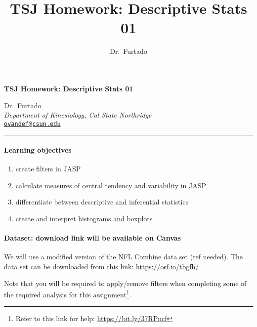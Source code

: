 \documentclass[11pt,]{article}
\title{TSJ \textbar{} Homework: Descriptive Stats 01}
\author{Dr.~Furtado}
\date{}
\newcommand{\blankline}{\quad\pagebreak[2]}
\providecommand{\tightlist}{%
  \setlength{\itemsep}{0pt}\setlength{\parskip}{0pt}}
\begin{document}
  



\thispagestyle{plain} 

\begin{flushleft}\Large \bf TSJ \textbar{} Homework: Descriptive Stats
01  \end{flushleft}
	\vspace{1 mm}   
Dr.~Furtado \\
\emph{Department of Kinesiology, Cal State Northridge} \\
\texttt{\href{mailto:ovandef@csun.edu}{\nolinkurl{ovandef@csun.edu}}}   \\

  

\hrule

\vspace{6 mm}
	


\hypertarget{learning-objectives}{%
\paragraph{Learning objectives}\label{learning-objectives}}

\begin{enumerate}
\def\labelenumi{\arabic{enumi}.}
\tightlist
\item
  create filters in JASP
\item
  calculate measures of central tendency and variability in JASP
\item
  differentiate between descriptive and inferential statistics
\item
  create and interpret histograms and boxplots
\end{enumerate}

\hypertarget{dataset-download-link-will-be-available-on-canvas}{%
\paragraph{Dataset: download link will be available on
Canvas}\label{dataset-download-link-will-be-available-on-canvas}}

We will use a modified version of the NFL Combine data set (ref needed).
The data set can be downloaded from this link:
\url{https://osf.io/tbgfh/}

Note that you will be required to apply/remove filters when completing
some of the required analysis for this assignment\footnote{Refer to this
  link for help: \url{https://bit.ly/37RPncf}}.
\end{document}
